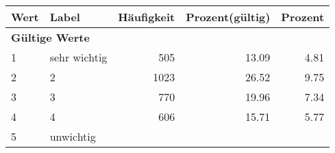      \begin{longtable}{lXrrr}
     \toprule
     \textbf{Wert} & \textbf{Label} & \textbf{Häufigkeit} & \textbf{Prozent(gültig)} & \textbf{Prozent} \\
     \endhead
     \midrule
     \multicolumn{5}{l}{\textbf{Gültige Werte}}\\

     1 &
     \multicolumn{1}{X}{ sehr wichtig   } &


       \num{505} &
       \num[round-mode=places,round-precision=2]{13.09} &
         \num[round-mode=places,round-precision=2]{4.81} \\

     2 &
     \multicolumn{1}{X}{ 2   } &


       \num{1023} &
       \num[round-mode=places,round-precision=2]{26.52} &
         \num[round-mode=places,round-precision=2]{9.75} \\

     3 &
     \multicolumn{1}{X}{ 3   } &


       \num{770} &
       \num[round-mode=places,round-precision=2]{19.96} &
         \num[round-mode=places,round-precision=2]{7.34} \\

     4 &
     \multicolumn{1}{X}{ 4   } &


       \num{606} &
       \num[round-mode=places,round-precision=2]{15.71} &
         \num[round-mode=places,round-precision=2]{5.77} \\

     5 &
     \multicolumn{1}{X}{ unwichtig   } &



\end{longtable}
